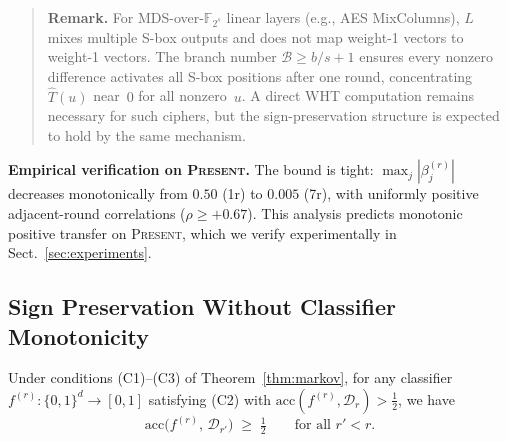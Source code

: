 \documentclass[runningheads]{llncs}
\newcommand{\present}{\textsc{Present}}
\begin{document}
\begin{quote}\small
\textbf{Remark.}
For MDS-over-$\mathbb{F}_{2^s}$ linear layers (e.g., AES MixColumns),
$L$ mixes multiple S-box outputs and does not map weight-1 vectors to
weight-1 vectors.
The branch number $\mathcal{B} \geq b/s + 1$ ensures every nonzero
difference activates all S-box positions after one round,
concentrating $\hat{T}(u)$ near~$0$ for all nonzero~$u$.
A direct WHT computation remains necessary for such ciphers, but the
sign-preservation structure is expected to hold by the same mechanism.
\end{quote}

\textbf{Empirical verification on \present.}
The bound is tight: $\max_j |\beta_j^{(r)}|$ decreases monotonically from $0.50$ (1r) to $0.005$ (7r), with uniformly positive adjacent-round correlations ($\rho \geq +0.67$).
This analysis predicts monotonic positive transfer on \present, which we verify experimentally in Sect.~\ref{sec:experiments}.

\subsection{Sign Preservation Without Classifier Monotonicity}

\begin{proposition}
\label{prop:sign-preservation}
Under conditions \textup{(C1)--(C3)} of
Theorem~\textup{\ref{thm:markov}}, for any classifier
$f^{(r)}\colon \{0,1\}^d \to [0,1]$ satisfying \textup{(C2)} with
$\mathrm{acc}(f^{(r)}, \mathcal{D}_r) > \tfrac{1}{2}$, we have
\[
  \mathrm{acc}\bigl(f^{(r)},\, \mathcal{D}_{r'}\bigr)
  \;\geq\;
  \tfrac{1}{2}
  \qquad\text{for all } r' < r.
\]
\end{proposition}
\end{document}
